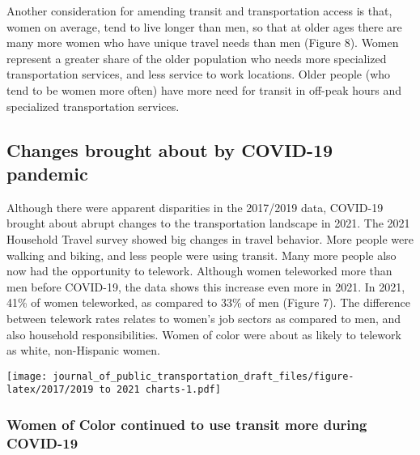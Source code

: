 \documentclass[
  12pt,
]{article}
\begin{document}
\begin{flushleft}
Another consideration for amending transit and transportation access is that, women on average, tend to live longer than men, so that at older ages there are many more women who have unique travel needs than men (Figure 8). Women represent a greater share of the older population who needs more specialized transportation services, and less service to work locations.  Older people (who tend to be women more often) have more need for transit in off-peak hours and specialized transportation services. 
\end{flushleft}

\newpage
\pagestyle{otherpages}
\setlength{\headheight}{10pt}
\setlength{\textheight}{665pt}
\fancyhead[L]{}

\hypertarget{changes-brought-about-by-covid-19-pandemic}{%
\subsection{Changes brought about by COVID-19
pandemic}\label{changes-brought-about-by-covid-19-pandemic}}

\begin{flushleft}
Although there were apparent disparities in the 2017/2019 data, COVID-19 brought about abrupt changes to the transportation landscape in 2021. The 2021 Household Travel survey showed big changes in travel behavior. More people were walking and biking, and less people were using transit. Many more people also now had the opportunity to telework. Although women teleworked more than men before COVID-19, the data shows this increase even more in 2021. In 2021, 41\% of women teleworked, as compared to 33\% of men (Figure 7). The difference between telework rates relates to women's job sectors as compared to men, and also household responsibilities. Women of color were about as likely to telework as white, non-Hispanic women.
\end{flushleft}

\texttt{[image: journal\_of\_public\_transportation\_draft\_files/figure-latex/2017/2019 to 2021 charts-1.pdf]}

\hypertarget{women-of-color-continued-to-use-transit-more-during-covid-19}{%
\subsubsection{Women of Color continued to use transit more during
COVID-19}\label{women-of-color-continued-to-use-transit-more-during-covid-19}}
\end{document}
